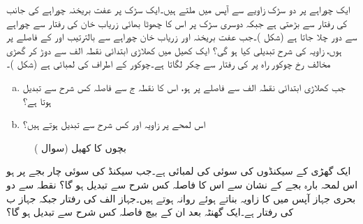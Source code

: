 \quad
ایک چوراہے پر دو سڑک  زاویے سے آپس میں ملتے ہیں۔ایک سڑک پر عفت بریخنہ چوراہے کی جانب  کی رفتار سے بڑھتی ہے جبکہ دوسری سڑک پر اس کا چھوٹا بھائی زریاب خان  کی رفتار سے چوراہے سے دور چلا جاتا ہے (شکل )۔جب عفت بریخنہ اور زریاب خان چوراہے سے بالترتیب  اور  کے فاصلے پر ہوں، زاویہ  کی شرح تبدیلی کیا ہو گی؟ 
ایک کھیل میں کھلاڑی ابتدائی نقطہ الف سے دوڑ کر گھڑی مخالف  رخ چوکور راہ پر  کی رفتار سے چکر لگاتا ہے۔چوکور کے اطراف کی لمبائی  ہے (شکل )۔
\begin{enumerate}[a.]
\item
جب کھلاڑی ابتدائی نقطہ الف سے  فاصلے پر ہو، اس کا نقطہ ج سے فاصلہ کس شرح سے تبدیل ہوتا ہے؟
\item
اس لمحے پر زاویہ  اور  کس شرح سے تبدیل ہوتے ہیں؟ 
\end{enumerate}
%
\begin{figure}
\centering
{}
\caption{بچوں کا کھیل (سوال )}
\label{شکل_سوال_تفرق_کھیل}
\end{figure}

ایک گھڑی کے سیکنڈوں کی سوئی کی لمبائی  ہے۔جب سیکنڈ کی  سوئی چار بجے پر ہو اس لمحہ بارہ بجے کے  نشان سے اس کا فاصلہ کس شرح سے تبدیل ہو گا؟ 
\quad
نقطہ  سے دو بحری جہاز آپس میں  کا زاویہ بناتے ہوئے روانہ ہوتے ہیں۔جہاز الف کی رفتار    جبکہ جہاز ب کی رفتار  ہے۔ایک گھنٹہ بعد ان کے بیچ فاصلہ کس شرح سے تبدیل ہو گا؟

